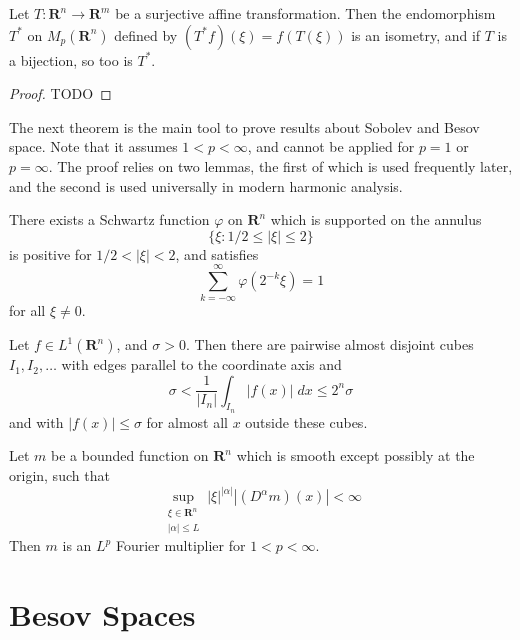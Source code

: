 \begin{theorem}
	Let $T: \mathbf{R}^n \to \mathbf{R}^m$ be a surjective affine transformation. Then the endomorphism $T^*$ on $M_p(\mathbf{R}^n)$ defined by $(T^* f)(\xi) = f(T(\xi))$ is an isometry, and if $T$ is a bijection, so too is $T^*$.
\end{theorem}
\begin{proof}
	TODO
\end{proof}

The next theorem is the main tool to prove results about Sobolev and Besov space. Note that it assumes $1 < p < \infty$, and cannot be applied for $p = 1$ or $p = \infty$. The proof relies on two lemmas, the first of which is used frequently later, and the second is used universally in modern harmonic analysis.

\begin{lemma}
	There exists a Schwartz function $\varphi$ on $\mathbf{R}^n$ which is supported on the annulus
	\[ \{ \xi: 1/2 \leq |\xi| \leq 2 \} \]
	is positive for $1/2 < |\xi| < 2$, and satisfies
	\[ \sum_{k = -\infty}^\infty \varphi(2^{-k} \xi) = 1 \]
	for all $\xi \neq 0$.
\end{lemma}

\begin{lemma}
	Let $f \in L^1(\mathbf{R}^n)$, and $\sigma > 0$. Then there are pairwise almost disjoint cubes $I_1, I_2, \dots$ with edges parallel to the coordinate axis and
	\[ \sigma < \frac{1}{|I_n|} \int_{I_n} |f(x)|\; dx \leq 2^n \sigma \]
	and with $|f(x)| \leq \sigma$ for almost all $x$ outside these cubes.
\end{lemma}

\begin{theorem}
	Let $m$ be a bounded function on $\mathbf{R}^n$ which is smooth except possibly at the origin, such that
	\[ \sup_{\substack{\xi \in \mathbf{R}^n\\|\alpha| \leq L}} |\xi|^{|\alpha|} |(D^\alpha m)(x)| < \infty \]
	Then $m$ is an $L^p$ Fourier multiplier for $1 < p < \infty$.
\end{theorem}

\section{Besov Spaces}

